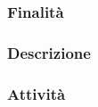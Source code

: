 \documentclass[../../norme-di-progetto.tex]{subfiles}
\begin{document}
\subsubsection{Finalità}%
\label{subs:miglioramento_del_processo/finalita}

\subsubsection{Descrizione}%
\label{subs:miglioramento_del_processo/descrizione}

\subsubsection{Attività}%
\label{subs:miglioramento_del_processo/attivita}


\end{document}
